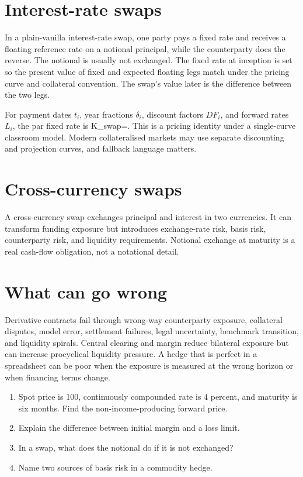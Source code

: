 \section{Interest-rate swaps}
In a plain-vanilla interest-rate swap, one party pays a fixed rate and receives a floating reference rate on a notional principal, while the counterparty does the reverse. The notional is usually not exchanged. The fixed rate at inception is set so the present value of fixed and expected floating legs match under the pricing curve and collateral convention. The swap's value later is the difference between the two legs.

For payment dates $t_i$, year fractions $\delta_i$, discount factors $DF_i$, and forward rates $L_i$, the par fixed rate is
  K_{swap}=.
\closeformula
This is a pricing identity under a single-curve classroom model. Modern collateralised markets may use separate discounting and projection curves, and fallback language matters.

\section{Cross-currency swaps}
A cross-currency swap exchanges principal and interest in two currencies. It can transform funding exposure but introduces exchange-rate risk, basis risk, counterparty risk, and liquidity requirements. Notional exchange at maturity is a real cash-flow obligation, not a notational detail.

\section{What can go wrong}
Derivative contracts fail through wrong-way counterparty exposure, collateral disputes, model error, settlement failures, legal uncertainty, benchmark transition, and liquidity spirals. Central clearing and margin reduce bilateral exposure but can increase procyclical liquidity pressure. A hedge that is perfect in a spreadsheet can be poor when the exposure is measured at the wrong horizon or when financing terms change.

\begin{exerciseblock}
\begin{enumerate}
  \item Spot price is 100, continuously compounded rate is 4 percent, and maturity is six months. Find the non-income-producing forward price.
  \item Explain the difference between initial margin and a loss limit.
  \item In a swap, what does the notional do if it is not exchanged?
  \item Name two sources of basis risk in a commodity hedge.
\end{enumerate}
\end{exerciseblock}

